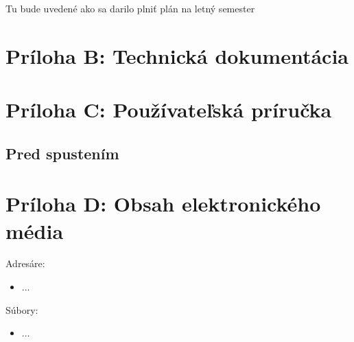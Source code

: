 \documentclass[12pt, twoside]{book}
\begin{document}
Tu bude uvedené ako sa darilo plniť plán na letný semester

\newpage
\pagestyle{fancy}
\setcounter{page}{1}
\renewcommand{\thepage}{B-\arabic{page}} 
\thispagestyle{plain}
\makeatletter
{}  %
\makeatother
{}
{}

\section*{Príloha B: Technická dokumentácia}



\section*{Príloha C: Používateľská príručka}



\subsection{Pred spustením}



\section*{Príloha D: Obsah elektronického média}

\bigskip
\bigskip

Adresáre:
\begin{itemize}
\item
...
\end{itemize}

Súbory:
\begin{itemize}
\item 
...
\end{itemize}
 
\end{document}
